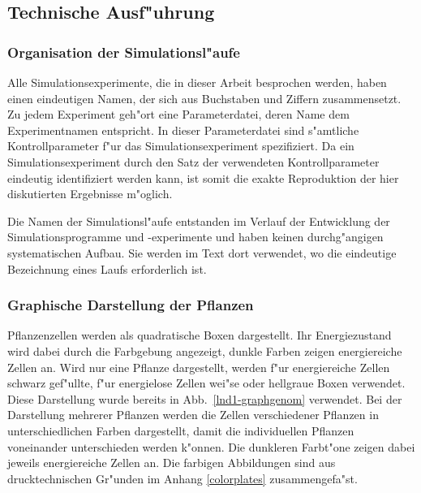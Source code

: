 \subsection{Technische Ausf"uhrung}
\label{technicaldef}

\subsubsection{Organisation der Simulationsl"aufe}

Alle Simulationsexperimente, die in dieser Arbeit besprochen werden, haben einen eindeutigen
Namen, der sich aus Buchstaben und Ziffern zusammensetzt. Zu jedem Experiment geh"ort
eine Parameterdatei, deren Name dem Experimentnamen entspricht. In dieser Parameterdatei
sind s"amtliche Kontrollparameter f"ur das Simulationsexperiment spezifiziert.
Da ein Simulationsexperiment durch den Satz der verwendeten Kontrollparameter eindeutig identifiziert
werden kann, ist somit die exakte Reproduktion der hier diskutierten Ergebnisse m"oglich.

Die Namen der Simulationsl"aufe entstanden im Verlauf der Entwicklung der Simulationsprogramme
und -experimente und haben keinen durchg"angigen systematischen Aufbau. Sie werden im Text dort
verwendet, wo die eindeutige Bezeichnung eines Laufs erforderlich ist.


\subsubsection{Graphische Darstellung der Pflanzen}

Pflanzenzellen werden als quadratische Boxen dargestellt. Ihr Energiezustand wird dabei durch die
Farbgebung angezeigt, dunkle Farben zeigen energiereiche Zellen an. Wird nur eine Pflanze dargestellt,
werden f"ur energiereiche Zellen schwarz gef"ullte, f"ur energielose Zellen wei"se oder hellgraue
Boxen verwendet. Diese Darstellung wurde bereits in Abb.\ \ref{lnd1-graphgenom} verwendet.
Bei der Darstellung mehrerer Pflanzen werden die Zellen verschiedener Pflanzen in
unterschiedlichen Farben dargestellt, damit die individuellen Pflanzen voneinander unterschieden
werden k"onnen. Die dunkleren Farbt"one zeigen dabei jeweils energiereiche Zellen an.
Die farbigen Abbildungen sind aus drucktechnischen Gr"unden im Anhang \ref{colorplates}
zusammengefa"st.

